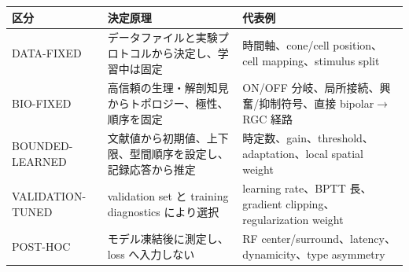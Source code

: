 \documentclass[a4paper,10pt,twocolumn,uplatex,dvipdfmx]{jsarticle}
\begin{document}
\begin{center}
\centering
{}
\label{tab:parameter-class}
\small
\setlength{\tabcolsep}{5pt}
\begin{tabularx}{0.92\textwidth}{
  >{\raggedright\arraybackslash}p{}
  >{\raggedright\arraybackslash}p{}
  Y}
\toprule
\textbf{区分} & \textbf{決定原理} & \textbf{代表例} \\
\midrule
DATA-FIXED &
データファイルと実験プロトコルから決定し、学習中は固定 &
時間軸、cone/cell position、cell mapping、stimulus split \\
BIO-FIXED &
高信頼の生理・解剖知見からトポロジー、極性、順序を固定 &
ON/OFF 分岐、局所接続、興奮/抑制符号、直接 bipolar$\rightarrow$RGC 経路 \\
BOUNDED-LEARNED &
文献値から初期値、上下限、型間順序を設定し、記録応答から推定 &
時定数、gain、threshold、adaptation、local spatial weight \\
VALIDATION-TUNED &
validation set と training diagnostics により選択 &
learning rate、BPTT 長、gradient clipping、regularization weight \\
POST-HOC &
モデル凍結後に測定し、loss へ入力しない &
RF center/surround、latency、dynamicity、type asymmetry \\
\bottomrule
\end{tabularx}
\end{center}

\clearpage
\end{document}
